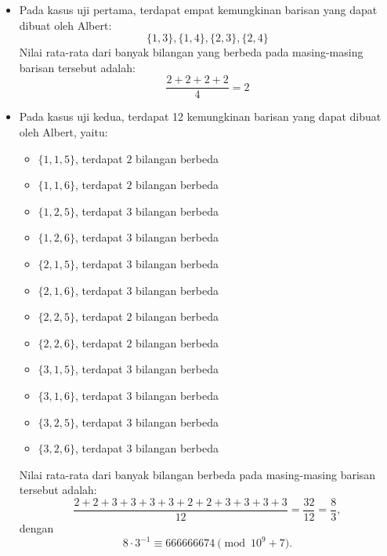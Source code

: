 \documentclass{article}
\begin{document}
\begin{itemize}

\item Pada kasus uji pertama, terdapat empat kemungkinan barisan yang dapat dibuat oleh Albert:
$$\{1,3\}, \{1,4\}, \{2,3\}, \{2,4\}$$
Nilai rata-rata dari banyak bilangan yang berbeda pada masing-masing barisan tersebut adalah:
$$\frac{2+2+2+2}{4} = 2$$
\item Pada kasus uji kedua, terdapat 12 kemungkinan barisan yang dapat dibuat oleh Albert, yaitu:
    \begin{itemize}
        \item $\{1,1,5\}$, terdapat $2$ bilangan berbeda
        \item $\{1,1,6\}$, terdapat $2$ bilangan berbeda
        \item $\{1,2,5\}$, terdapat $3$ bilangan berbeda
        \item $\{1,2,6\}$, terdapat $3$ bilangan berbeda
        \item $\{2,1,5\}$, terdapat $3$ bilangan berbeda
        \item $\{2,1,6\}$, terdapat $3$ bilangan berbeda
        \item $\{2,2,5\}$, terdapat $2$ bilangan berbeda
        \item $\{2,2,6\}$, terdapat $2$ bilangan berbeda
        \item $\{3,1,5\}$, terdapat $3$ bilangan berbeda
        \item $\{3,1,6\}$, terdapat $3$ bilangan berbeda
        \item $\{3,2,5\}$, terdapat $3$ bilangan berbeda
        \item $\{3,2,6\}$, terdapat $3$ bilangan berbeda
    \end{itemize}
    Nilai rata-rata dari banyak bilangan berbeda pada masing-masing barisan tersebut adalah:
    $$\frac{2+2+3+3+3+3+2+2+3+3+3+3}{12} = \frac{32}{12} = \frac{8}{3},$$
    dengan
    $$ 8 \cdot 3^{-1} \equiv 666666674 \pmod {10^9 + 7}.$$

\end{itemize} 
\end{document}
